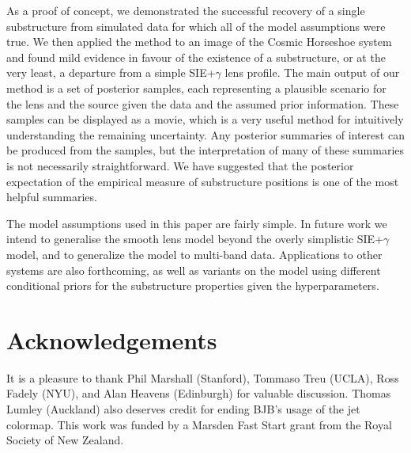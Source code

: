 \documentclass[useAMS,usenatbib]{mn2e}
\begin{document}
As a proof of concept, we demonstrated the successful recovery of a single
substructure from simulated data for which all of the model assumptions were
true. We then applied the method to an image of the Cosmic Horseshoe system
and found mild evidence in favour of the existence of a substructure, or at
the very least, a departure from a simple SIE+$\gamma$ lens profile. The
main output of our method is a set of posterior samples, each representing
a plausible scenario for the lens and the source given the data
and the assumed prior information. These samples can be displayed as a movie,
which is a very useful method for intuitively understanding the remaining
uncertainty. Any posterior summaries of interest can be
produced from the samples, but the interpretation of many of these summaries
is not necessarily straightforward. We have suggested that the
posterior expectation of the empirical measure of substructure positions is
one of the most helpful summaries.

The model assumptions used in this paper are fairly simple. In future work we
intend to generalise the smooth lens model beyond the overly simplistic
SIE+$\gamma$ model, and to generalize the model to multi-band data. Applications
to other systems are also forthcoming, as well as variants on the model using
different conditional priors for the substructure properties given the
hyperparameters.

\section*{Acknowledgements}
It is a pleasure to thank Phil Marshall (Stanford), Tommaso Treu (UCLA),
Ross Fadely (NYU), and Alan Heavens (Edinburgh)
for valuable discussion. Thomas Lumley (Auckland) also deserves credit for
ending BJB's usage of the jet colormap.
This work was funded by a Marsden Fast Start grant from the Royal Society of
New Zealand.
\end{document}
